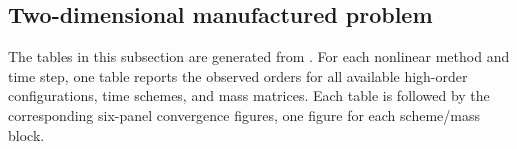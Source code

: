 \subsection{Two-dimensional manufactured problem}
The tables in this subsection are generated from
.
For each nonlinear method and time step, one table reports the observed
orders for all available high-order configurations, time schemes, and mass
matrices. Each table is followed by the corresponding six-panel convergence
figures, one figure for each scheme/mass block.

\subsubsection{}
